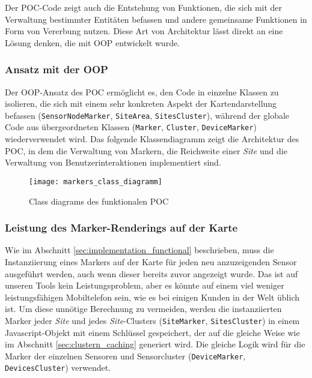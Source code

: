 Der POC-Code zeigt auch die Entstehung von Funktionen, die sich mit der Verwaltung bestimmter Entitäten befassen und andere gemeinsame Funktionen in Form von Vererbung nutzen.
Diese Art von Architektur lässt direkt an eine Lösung denken, die mit \ac{OOP} entwickelt wurde.

\subsubsection{Ansatz mit der \ac{OOP}}

Der \ac{OOP}-Ansatz des \ac{POC} ermöglicht es, den Code in einzelne Klassen zu isolieren, die sich mit einem sehr konkreten Aspekt der Kartendarstellung befassen (\lstinline{SensorNodeMarker}, \lstinline{SiteArea}, \lstinline{SitesCluster}), während der globale Code aus übergeordneten Klassen (\lstinline{Marker}, \lstinline{Cluster}, \lstinline{DeviceMarker}) wiederverwendet wird.
Das folgende Klassendiagramm zeigt die Architektur des \ac{POC}, in dem die Verwaltung von Markern, die Reichweite einer \textit{Site} und die Verwaltung von Benutzerinteraktionen implementiert sind.

\begin{figure}[H]
  \centering
  \texttt{[image: markers\_class\_diagramm]}
  \caption{Class diagrams des funktionalen POC}
  \label{fig:markers_class_diagramm}
\end{figure}

\subsubsection{Leistung des Marker-Renderings auf der Karte}

Wie im Abschnitt \ref{sec:implementation_functional} beschrieben, muss die Instanziierung eines Markers auf der Karte für jeden neu anzuzeigenden Sensor ausgeführt werden, auch wenn dieser bereits zuvor angezeigt wurde.
Das ist auf unseren Tools kein Leistungsproblem, aber es könnte auf einem viel weniger leistungsfähigen Mobiltelefon sein, wie es bei einigen Kunden in der Welt üblich ist.
Um diese unnötige Berechnung zu vermeiden, werden die instanziierten Marker jeder \textit{Site} und jedes \textit{Site}-Clusters (\lstinline{SiteMarker}, \lstinline{SitesCluster}) in einem Javascript-Objekt mit einem Schlüssel gespeichert, der auf die gleiche Weise wie im Abschnitt \ref{sec:clustern_caching} generiert wird.
Die gleiche Logik wird für die Marker der einzelnen Sensoren und Sensorcluster (\lstinline{DeviceMarker}, \lstinline{DevicesCluster}) verwendet.

